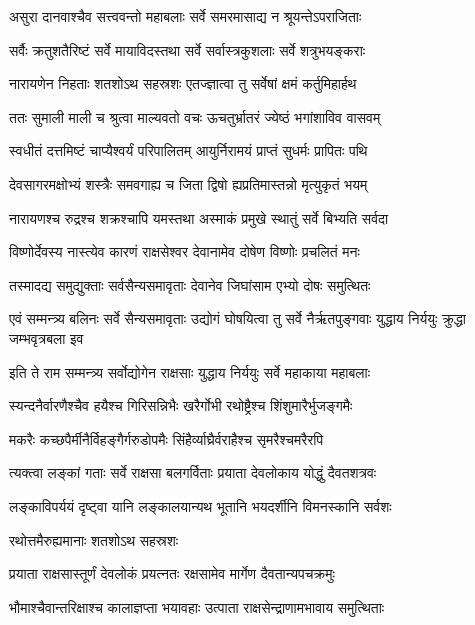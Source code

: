 \twolineshloka
{असुरा दानवाश्चैव सत्त्ववन्तो महाबलाः}
{सर्वे समरमासाद्य न श्रूयन्तेऽपराजिताः} %

\twolineshloka
{सर्वैः क्रतुशतैरिष्टं सर्वे मायाविदस्तथा}
{सर्वे सर्वास्त्रकुशलाः सर्वे शत्रुभयङ्कराः} %

\twolineshloka
{नारायणेन निहताः शतशोऽथ सहस्रशः}
{एतज्ज्ञात्वा तु सर्वेषां क्षमं कर्तुमिहार्हथ} %

\twolineshloka
{ततः सुमाली माली च श्रुत्वा माल्यवतो वचः}
{ऊचतुर्भ्रातरं ज्येष्ठं भगांशाविव वासवम्} %

\twolineshloka
{स्वधीतं दत्तमिष्टं चाप्यैश्वर्यं परिपालितम्}
{आयुर्निरामयं प्राप्तं सुधर्मः प्रापितः पथि} %

\twolineshloka
{देवसागरमक्षोभ्यं शस्त्रैः समवगाह्य च}
{जिता द्विषो ह्यप्रतिमास्तन्नो मृत्युकृतं भयम्} %

\twolineshloka
{नारायणश्च रुद्रश्च शक्रश्चापि यमस्तथा}
{अस्माकं प्रमुखे स्थातुं सर्वे बिभ्यति सर्वदा} %

\twolineshloka
{विष्णोर्देवस्य नास्त्येव कारणं राक्षसेश्वर}
{देवानामेव दोषेण विष्णोः प्रचलितं मनः} %

\twolineshloka
{तस्मादद्य समुद्युक्ताः सर्वसैन्यसमावृताः}
{देवानेव जिघांसाम एभ्यो दोषः समुत्थितः} %

\twolineshloka
{एवं सम्मन्त्र्य बलिनः सर्वे सैन्यसमावृताः}
{उद्योगं घोषयित्वा तु सर्वे नैर्ऋतपुङ्गवाः युद्धाय निर्ययुः क्रुद्धा जम्भवृत्रबला इव} %

\twolineshloka
{इति ते राम सम्मन्त्र्य सर्वोद्योगेन राक्षसाः}
{युद्धाय निर्ययुः सर्वे महाकाया महाबलाः} %

\twolineshloka
{स्यन्दनैर्वारणैश्चैव हयैश्च गिरिसन्निभैः}
{खरैर्गोभी रथोष्ट्रैश्च शिंशुमारैर्भुजङ्गमैः} %

\twolineshloka
{मकरैः कच्छपैर्मीनैर्विहङ्गैर्गरुडोपमैः}
{सिंहैर्व्याघ्रैर्वराहैश्च सृमरैश्चमरैरपि} %

\twolineshloka
{त्यक्त्वा लङ्कां गताः सर्वे राक्षसा बलगर्विताः}
{प्रयाता देवलोकाय योद्धुं दैवतशत्रवः} %

\twolineshloka
{लङ्काविपर्ययं दृष्ट्वा यानि लङ्कालयान्यथ}
{भूतानि भयदर्शीनि विमनस्कानि सर्वशः} %

\onelineshloka
{रथोत्तमैरुह्यमानाः शतशोऽथ सहस्रशः} %

\twolineshloka
{प्रयाता राक्षसास्तूर्णं देवलोकं प्रयत्नतः}
{रक्षसामेव मार्गेण दैवतान्यपचक्रमुः} %

\twolineshloka
{भौमाश्चैवान्तरिक्षाश्च कालाज्ञप्ता भयावहाः}
{उत्पाता राक्षसेन्द्राणामभावाय समुत्थिताः} %

